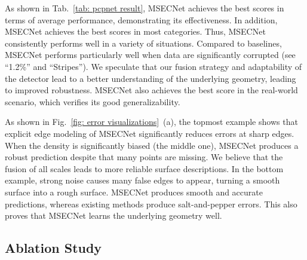 \documentclass[sigconf]{acmart}
\begin{document}
As shown in Tab.~\ref{tab: pcpnet result}, MSECNet achieves the best scores in terms of average performance, demonstrating its effectiveness. In addition, MSECNet achieves the best scores in most categories. Thus, MSECNet consistently performs well in a variety of situations.
Compared to baselines, MSECNet performs particularly well when data are significantly corrupted (see ``1.2\%'' and ``Stripes''). We speculate that our fusion strategy and adaptability of the detector lead to a better understanding of the underlying geometry, leading to improved robustness. 
MSECNet also achieves the best score in the real-world scenario, which verifies its good generalizability. 

As shown in Fig.~\ref{fig: error visualizations}~(a), the topmost example shows that explicit edge modeling of MSECNet significantly reduces errors at sharp edges. 
When the density is significantly biased (the middle one), MSECNet produces a robust prediction despite that many points are missing. 
We believe that the fusion of all scales leads to more reliable surface descriptions.
In the bottom example, strong noise causes many false edges to appear, turning a smooth surface into a rough surface. MSECNet produces smooth and accurate predictions, whereas existing methods produce salt-and-pepper errors. This also proves that MSECNet learns the underlying geometry well.




\subsection{Ablation Study}\label{sec: ablation}
\end{document}
